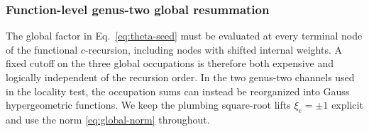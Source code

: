 \documentclass[11pt]{article}
\begin{document}
\subsubsection{Function-level genus-two global resummation}
\label{sec:genus-two-global-resummation}

The global factor in Eq.~\eqref{eq:theta-seed} must be evaluated at every
terminal node of the functional \(c\)-recursion, including nodes with shifted
internal weights.  A fixed cutoff on the three global occupations is therefore
both expensive and logically independent of the recursion order.  In the two
genus-two channels used in the locality test, the occupation sums can instead
be reorganized into Gauss hypergeometric functions.  We keep the plumbing
square-root lifts \(\xi_e=\pm1\) explicit and use the norm
\eqref{eq:global-norm} throughout.
\end{document}
